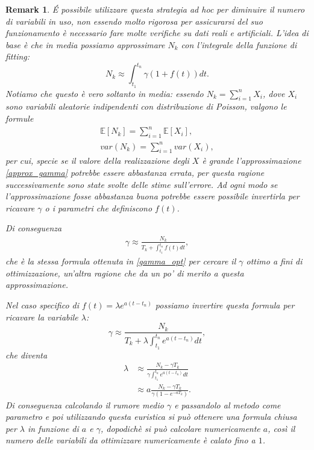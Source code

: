 \documentclass[10pt,a4paper]{report}
\newtheorem{remark}{Remark}
\begin{document}
\begin{remark}
\'E possibile utilizzare questa strategia ad hoc per diminuire il numero di variabili in uso, non essendo molto rigorosa per assicurarsi del suo funzionamento è necessario fare molte verifiche su dati reali e artificiali. L'idea di base è che in media possiamo approssimare $N_k$ con l'integrale della funzione di fitting:
\begin{equation}
N_k \approx \int_{t_1}^{t_n}\gamma\left(1+f(t)\right)dt.\label{approx_gamma}
\end{equation}
Notiamo che questo è vero soltanto in media: essendo $N_k=\sum_{i=1}^nX_i$, dove $X_i$ sono variabili aleatorie indipendenti con distribuzione di Poisson, valgono le formule 
\begin{gather*}
\mathbb{E}[N_k]=\sum_{i=1}^n\mathbb{E}[X_i],\\
var(N_k)=\sum_{i=1}^nvar(X_i),
\end{gather*}
per cui, specie se il valore della realizzazione degli $X$ è grande l'approssimazione \eqref{approx_gamma} potrebbe essere abbastanza errata, per questa ragione successivamente sono state svolte delle stime sull'errore. Ad ogni modo se l'approssimazione fosse abbastanza buona potrebbe essere possibile invertirla per ricavare $\gamma$ o i parametri che definiscono $f(t)$. 

Di conseguenza
\begin{align*}
\gamma \approx \frac{N_k}{T_k+\int_{t_1}^{t_n}f(t)dt},
\end{align*}
che è la stessa formula ottenuta in \eqref{gamma_opt} per cercare il $\gamma$ ottimo a fini di ottimizzazione, un'altra ragione che da un po' di merito a questa approssimazione.

Nel caso specifico di $f(t)=\lambda e^{a(t-t_n)}$ possiamo invertire questa formula per ricavare la variabile $\lambda$:
$$
\gamma\approx\frac{N_k}{T_k+\lambda\int_{t_1}^{t_n}e^{a(t-t_n)}dt},
$$
che diventa
\begin{align*}
\lambda&\approx\frac{N_k-\gamma T_k}{\gamma\int_{t_1}^{t_n}e^{a(t-t_n)}dt}\\
&\approx a\frac{N_k-\gamma T_k}{\gamma(1-e^{-aT_k})}.
\end{align*}
Di conseguenza calcolando il rumore medio $\gamma$ e passandolo al metodo come parametro e poi utilizzando questa euristica si può ottenere una formula chiusa per $\lambda$ in funzione di $a$ e $\gamma$, dopodichè si può calcolare numericamente $a$, così il numero delle variabili da ottimizzare numericamente è calato fino a $1$.


\end{remark}
\end{document}
